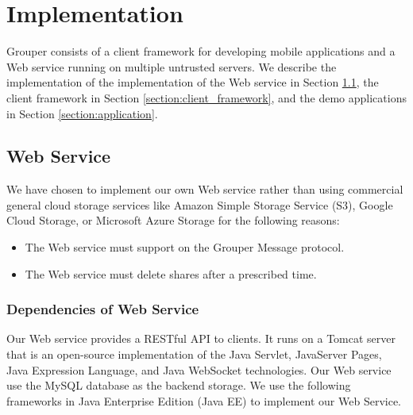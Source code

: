 \documentclass[a4paper,11pt]{report}
\begin{document}
\chapter{Implementation} \label{chapter:implementation}

Grouper consists of a client framework for developing mobile applications and a Web service running on multiple untrusted servers.
We describe the implementation of the implementation of the Web service in Section \ref{section:web_service}, the client framework in Section \ref{section:client_framework}, and the demo applications in Section \ref{section:application}.

\section{Web Service} \label{section:web_service}

We have chosen to implement our own Web service rather than using commercial general cloud storage services like Amazon Simple Storage Service (S3), Google Cloud Storage, or Microsoft Azure Storage for the following reasons:

\begin{itemize}[leftmargin=7mm]
	\setlength{\itemsep}{1pt}
	\setlength{\parskip}{0pt}
	\setlength{\parsep}{0pt}
	\item The Web service must support on the Grouper Message protocol.
	\item The Web service must delete shares after a prescribed time.
\end{itemize}

\subsection{Dependencies of Web Service} \label{subsection:dependencies_client}

Our Web service provides a RESTful API to clients.
It runs on a Tomcat server\cite{tomcat} that is an open-source implementation of the Java Servlet, JavaServer Pages, Java Expression Language, and Java WebSocket technologies.
Our Web service use the MySQL\cite{mysql} database as the backend storage.
We use the following frameworks in Java Enterprise Edition (Java EE) to implement our Web Service.
\end{document}
